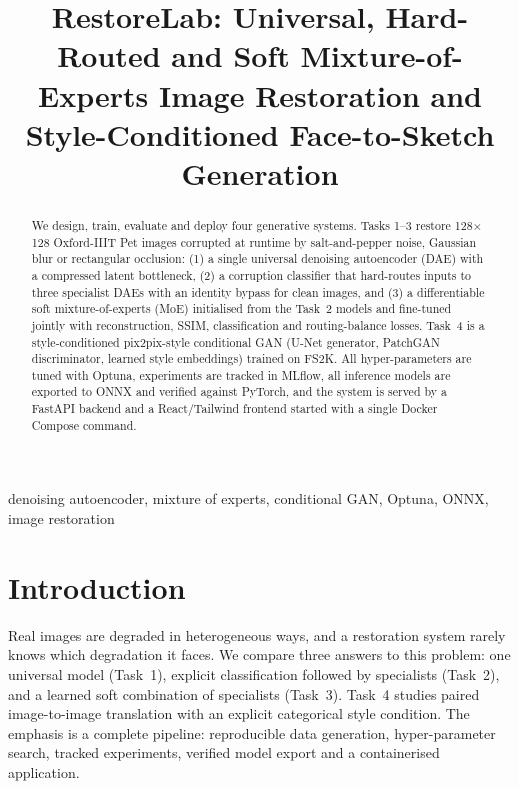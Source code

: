 \documentclass[conference]{IEEEtran}
\begin{document}
\title{RestoreLab: Universal, Hard-Routed and Soft Mixture-of-Experts Image Restoration and Style-Conditioned Face-to-Sketch Generation}

\author{
}

\maketitle

\begin{abstract}
We design, train, evaluate and deploy four generative systems. Tasks 1--3 restore 128$\times$128 Oxford-IIIT Pet images corrupted at runtime by salt-and-pepper noise, Gaussian blur or rectangular occlusion: (1) a single universal denoising autoencoder (DAE) with a compressed latent bottleneck, (2) a corruption classifier that hard-routes inputs to three specialist DAEs with an identity bypass for clean images, and (3) a differentiable soft mixture-of-experts (MoE) initialised from the Task~2 models and fine-tuned jointly with reconstruction, SSIM, classification and routing-balance losses. Task~4 is a style-conditioned pix2pix-style conditional GAN (U-Net generator, PatchGAN discriminator, learned style embeddings) trained on FS2K. All hyper-parameters are tuned with Optuna, experiments are tracked in MLflow, all inference models are exported to ONNX and verified against PyTorch, and the system is served by a FastAPI backend and a React/Tailwind frontend started with a single Docker Compose command.
\end{abstract}

\begin{IEEEkeywords}
denoising autoencoder, mixture of experts, conditional GAN, Optuna, ONNX, image restoration
\end{IEEEkeywords}

\section{Introduction}
Real images are degraded in heterogeneous ways, and a restoration system rarely knows which degradation it faces. We compare three answers to this problem: one universal model (Task~1), explicit classification followed by specialists (Task~2), and a learned soft combination of specialists (Task~3). Task~4 studies paired image-to-image translation with an explicit categorical style condition. The emphasis is a complete pipeline: reproducible data generation, hyper-parameter search, tracked experiments, verified model export and a containerised application.
\end{document}
